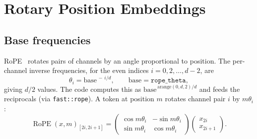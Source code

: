 \documentclass[11pt,a4paper]{report}
\newcommand{\code}[1]{\texttt{#1}}
\newcommand{\rope}{\operatorname{RoPE}}
\begin{document}
\chapter{Rotary Position Embeddings}
\label{ch:rope}

\section{Base frequencies}
RoPE~\citep{su2021rope} rotates pairs of channels by an angle proportional to
position. The per-channel inverse frequencies, for the even indices
$i=0,2,\dots,d-2$, are
\begin{equation}
  \theta_i = \text{base}^{\,-\,i/d}, \qquad \text{base} = \texttt{rope\_theta},
\end{equation}
giving $d/2$ values. The code computes this as
$\text{base}^{\,\text{arange}(0,d,2)/d}$ and feeds the reciprocals (via
\code{fast::rope}). A token at position $m$ rotates channel pair $i$ by $m\theta_i$:
\begin{equation}
  \rope(x, m)_{[2i,2i+1]} =
  \begin{pmatrix} \cos m\theta_i & -\sin m\theta_i \\ \sin m\theta_i & \cos m\theta_i \end{pmatrix}
  \begin{pmatrix} x_{2i} \\ x_{2i+1} \end{pmatrix}.
\end{equation}
\end{document}
